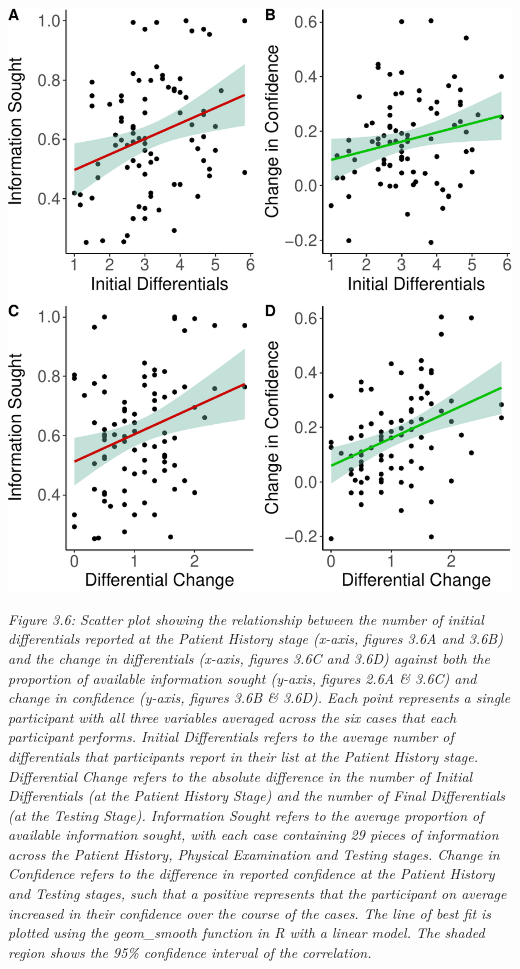 \documentclass[a4paper, nobind]{templates/ociamthesis}
\begin{document}
\begin{center}\includegraphics[width=1\linewidth]{_main_files/figure-latex/diffsPlot-1} \end{center}

\emph{Figure 3.6: Scatter plot showing the relationship between the number of initial differentials reported at the Patient History stage (x-axis, figures 3.6A and 3.6B) and the change in differentials (x-axis, figures 3.6C and 3.6D) against both the proportion of available information sought (y-axis, figures 2.6A \& 3.6C) and change in confidence (y-axis, figures 3.6B \& 3.6D). Each point represents a single participant with all three variables averaged across the six cases that each participant performs. Initial Differentials refers to the average number of differentials that participants report in their list at the Patient History stage. Differential Change refers to the absolute difference in the number of Initial Differentials (at the Patient History Stage) and the number of Final Differentials (at the Testing Stage). Information Sought refers to the average proportion of available information sought, with each case containing 29 pieces of information across the Patient History, Physical Examination and Testing stages. Change in Confidence refers to the difference in reported confidence at the Patient History and Testing stages, such that a positive represents that the participant on average increased in their confidence over the course of the cases. The line of best fit is plotted using the geom\_smooth function in R with a linear model. The shaded region shows the 95\% confidence interval of the correlation.}
\end{document}

